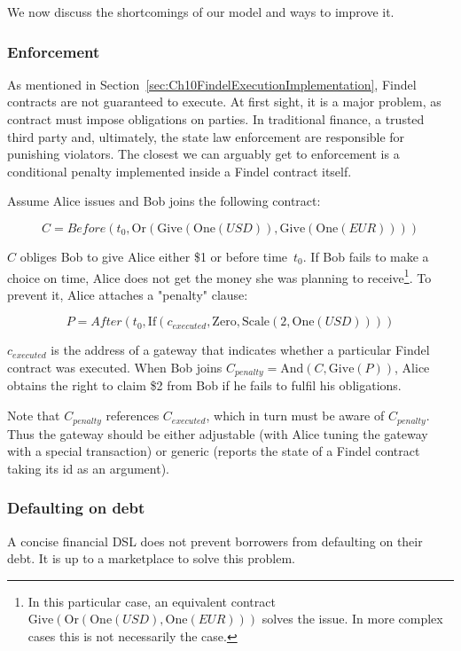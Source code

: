 We now discuss the shortcomings of our model and ways to improve it.

\subsubsection{Enforcement} \label{sec:Ch10FindelEnforcement}

As mentioned in Section~\ref{sec:Ch10FindelExecutionImplementation}, Findel contracts are not guaranteed to execute.
At first sight, it is a major problem, as contract must impose obligations on parties.
In traditional finance, a trusted third party and, ultimately, the state law enforcement are responsible for punishing violators.
The closest we can arguably get to enforcement is a conditional penalty implemented inside a Findel contract itself.

Assume Alice issues and Bob joins the following contract:

\[C=Before(t_0,\mathrm{Or}(\mathrm{Give}(\mathrm{One}(USD)),\mathrm{Give}(\mathrm{One}(EUR))))\]

\(C\) obliges Bob to give Alice either \$1 or  before time~$t_0$.
If Bob fails to make a choice on time, Alice does not get the money she was planning to receive\footnote{In this particular case, an equivalent contract \(\mathrm{Give}(\mathrm{Or}(\mathrm{One}(USD),\mathrm{One}(EUR)))\) solves the issue. In more complex cases this is not necessarily the case.}.
To prevent it, Alice attaches a "penalty" clause:

\[P=After(t_0,\mathrm{If}(c_{executed},\mathrm{Zero},\mathrm{Scale}(2,\mathrm{One}(USD))))\]

\(c_{executed}\) is the address of a gateway that indicates whether a particular Findel contract was executed.
When Bob joins \(C_{penalty}=\mathrm{And}(C,\mathrm{Give}(P))\), Alice obtains the right to claim \$2 from Bob if he fails to fulfil his obligations.

Note that \(C_{penalty}\) references \(C_{executed}\), which in turn must be aware of \(C_{penalty}\).
Thus the gateway should be either adjustable (with Alice tuning the gateway with a special transaction) or generic (reports the state of a Findel contract taking its id as an argument).


\subsubsection{Defaulting on debt}

A concise financial DSL does not prevent borrowers from defaulting on their debt.
It is up to a marketplace to solve this problem.

